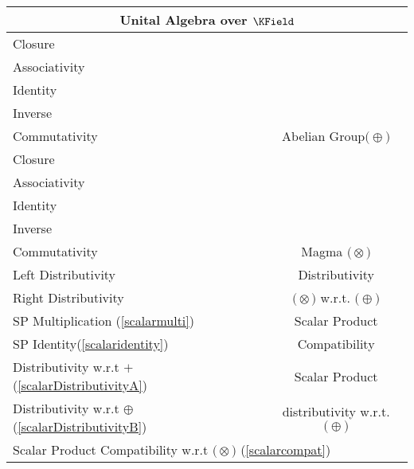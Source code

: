 \documentclass[a4paper,12pt]{scrartcl}    %
\newcommand{\OpA}{\otimes}
\newcommand{\OpB}{\oplus}
\begin{document}
\begin{minipage}[c]{0,5\textwidth}
\vspace{0.6cm}
\begin{tabular}{|l|c|} %
  \hline
  \multicolumn{2}{c}{\cellcolor{green!25}Unital Algebra over $\KField$} \\
  \hline
    \cellcolor{blue!25} \footnotesize Closure& \cellcolor{yellow!25}  \\
    \cellcolor{blue!25} \footnotesize Associativity& \cellcolor{yellow!25}  \\
    \cellcolor{blue!25} \footnotesize Identity& \cellcolor{yellow!25} \\
    \cellcolor{blue!25} \footnotesize Inverse& \cellcolor{yellow!25} \\
    \cellcolor{blue!25} \footnotesize Commutativity& \multirow{-5}{*}{\tiny\cellcolor{yellow!25}Abelian Group$\big(\OpB\big)$} \\
   \hline
    \cellcolor{blue!25} \footnotesize Closure& \cellcolor{yellow!25}  \\
    \cellcolor{blue!25} \footnotesize Associativity& \cellcolor{yellow!25}  \\
    \cellcolor{blue!25} \footnotesize Identity& \cellcolor{yellow!25} \\
    \cellcolor{red!25} \footnotesize Inverse& \cellcolor{yellow!25} \\
    \cellcolor{red!25} \footnotesize Commutativity& \multirow{-5}{*}{\tiny\cellcolor{yellow!25} Magma $\big(\OpA\big)$} \\
  \hline
  	\cellcolor{blue!25} \footnotesize Left Distributivity&  \tiny\cellcolor{yellow!25}Distributivity\\
    \cellcolor{blue!25} \footnotesize Right Distributivity & \tiny\cellcolor{yellow!25} $\big(\OpA\big)$ w.r.t. $\big(\OpB\big)$  \\
   \hline
  \hline
     \cellcolor{blue!25} \footnotesize SP Multiplication (\ref{scalarmulti})&  \tiny\cellcolor{yellow!25}Scalar Product\\
    \cellcolor{blue!25} \footnotesize SP Identity(\ref{scalaridentity}) & \tiny\cellcolor{yellow!25} Compatibility  \\
   \hline 
    \cellcolor{blue!25} \footnotesize Distributivity w.r.t $+$ (\ref{scalarDistributivityA})&  \tiny\cellcolor{yellow!25}Scalar Product\\
    \cellcolor{blue!25} \footnotesize Distributivity w.r.t $\OpB$ (\ref{scalarDistributivityB}) & \tiny\cellcolor{yellow!25} distributivity w.r.t. $\big(\OpB\big)$  \\
   \hline
    \multicolumn{2}{l}{\footnotesize \cellcolor{blue!25} Scalar Product Compatibility w.r.t  $\big(\OpA\big)$ (\ref{scalarcompat})}\\
   \hline
\end{tabular}

\end{minipage}
\end{document}
